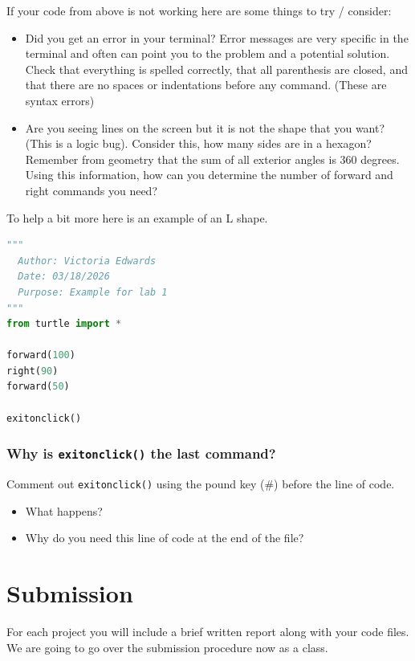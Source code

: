 \documentclass[12pt]{article}
\begin{document}
If your code from above is not working here are some things to try / consider:
\begin{itemize}
\item Did you get an error in your terminal? Error messages are very specific in the terminal and often can point you to the problem and a potential solution. Check that everything is spelled correctly, that all parenthesis are closed, and that there are no spaces or indentations before any command. (These are syntax errors)
\item Are you seeing lines on the screen but it is not the shape that you want? (This is a logic bug). Consider this, how many sides are in a hexagon? Remember from geometry that the sum of all exterior angles is 360 degrees. Using this information, how can you determine the number of forward and right commands you need? 
\end{itemize}

To help a bit more here is an example of an L shape.
\begin{lstlisting}[language=Python]
"""
  Author: Victoria Edwards
  Date: 03/18/2026
  Purpose: Example for lab 1
"""
from turtle import *

forward(100)
right(90)
forward(50)

exitonclick() \end{lstlisting}

\subsubsection{Why is \texttt{exitonclick()} the last command?}
Comment out \texttt{exitonclick()} using the pound key (\#) before the line of code.

\begin{itemize}
  \item What happens?
  \item Why do you need this line of code at the end of the file? 
\end{itemize}

\section{Submission}
For each project you will include a brief written report along with your code files.
We are going to go over the submission procedure now as a class. 
\end{document}
